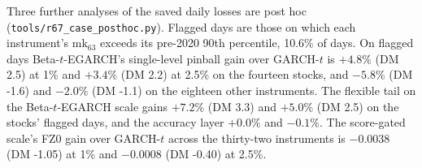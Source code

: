 Three further analyses of the saved daily losses are post hoc (\texttt{tools/r67\_case\_posthoc.py}). Flagged days are those on which each instrument's $\mathrm{mk}_{63}$ exceeds its pre-2020 90th percentile, 10.6\% of days. On flagged days Beta-$t$-EGARCH's single-level pinball gain over GARCH-$t$ is $+4.8\%$ (DM 2.5) at 1\% and $+3.4\%$ (DM 2.2) at 2.5\% on the fourteen stocks, and $-5.8\%$ (DM -1.6) and $-2.0\%$ (DM -1.1) on the eighteen other instruments. The flexible tail on the Beta-$t$-EGARCH scale gains $+7.2\%$ (DM 3.3) and $+5.0\%$ (DM 2.5) on the stocks' flagged days, and the accuracy layer $+0.0\%$ and $-0.1\%$. The score-gated scale's FZ0 gain over GARCH-$t$ across the thirty-two instruments is $-0.0038$ (DM -1.05) at 1\% and $-0.0008$ (DM -0.40) at 2.5\%.

